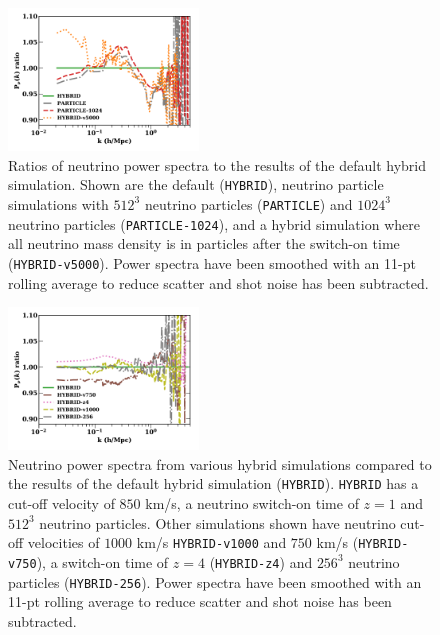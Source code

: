 \documentclass[useAMS, usenatbib]{mnras}
\begin{document}
\begin{figure}
  \includegraphics[width=0.45\textwidth]{nuplots/pks_nu_ckrel2-1.pdf}
    \caption{Ratios of neutrino power spectra to the results of the default hybrid simulation. Shown are the default (\texttt{HYBRID}), neutrino particle simulations with $512^3$ neutrino particles (\texttt{PARTICLE}) and $1024^3$ neutrino particles (\texttt{PARTICLE-1024}), and a hybrid simulation where all neutrino mass density is in particles after the switch-on time (\texttt{HYBRID-v5000}). Power spectra have been smoothed with an 11-pt rolling average to reduce scatter and shot noise has been subtracted.}
  \label{fig:hybparticle}
\end{figure}

\begin{figure}
  \includegraphics[width=0.45\textwidth]{nuplots/pks_nu_ckrel-1.pdf}
  \caption{Neutrino power spectra from various hybrid simulations compared to the results of the default hybrid simulation (\texttt{HYBRID}). \texttt{HYBRID} has a cut-off velocity of $850$ km/s, a neutrino switch-on time of $z=1$ and $512^3$ neutrino particles. Other simulations shown have neutrino cut-off velocities of $1000$ km/s \texttt{HYBRID-v1000} and $750$ km/s (\texttt{HYBRID-v750}), a switch-on time of $z=4$  (\texttt{HYBRID-z4}) and $256^3$ neutrino particles (\texttt{HYBRID-256}). Power spectra have been smoothed with an 11-pt rolling average to reduce scatter and shot noise has been subtracted.}
  \label{fig:vcrit}
\end{figure}
\end{document}
